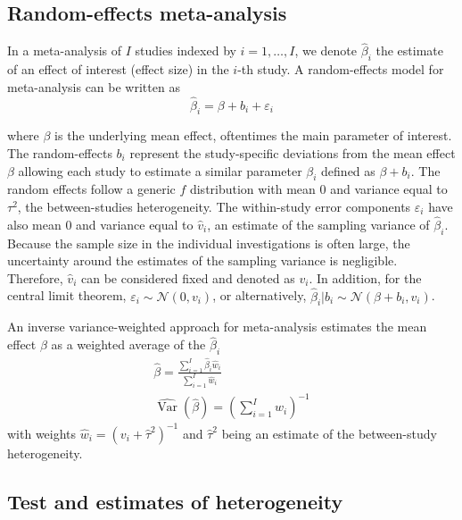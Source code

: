 \documentclass[11pt,a4paper,twoside,openany]{book}\usepackage{knitr}
\DeclareMathOperator{\Var}{Var}
\begin{document}
{\begin{knitrout}
\end{knitrout}


\subsection{Random-effects meta-analysis}
\label{sec:rma}

In a meta-analysis of $I$ studies indexed by $i = 1, \dots, I$, we denote $\hat \beta_i$ the estimate of an effect of interest (effect size) in the $i$-th study.
A random-effects model for meta-analysis can be written as
\begin{equation}
\hat \beta_i = \beta + b_i + \varepsilon_i
\label{eq:rma}
\end{equation}

\noindent where $\beta$ is the underlying mean effect, oftentimes the main parameter of interest. The random-effects $b_i$ represent the study-specific deviations from the mean effect $\beta$ allowing each study to estimate a similar parameter $\beta_i$ defined as $\beta + b_i $. The random effects follow a generic $f$ distribution with mean 0 and variance equal to $\tau^2$, the between-studies heterogeneity. 
The within-study error components $\varepsilon_i$ have also mean 0 and variance equal to $\hat v_i$, an estimate of the sampling variance of $\hat \beta_i$.
Because the sample size in the individual investigations is often large, the uncertainty around the estimates of the sampling variance is negligible. Therefore, $\hat v_i$ can be considered fixed and denoted as $v_i$. In addition, for the central limit theorem, $\varepsilon_i \sim  \mathcal{N}\left(0, v_i \right)$, or alternatively, $\hat \beta_i | b_i \sim \mathcal{N}\left(\beta+b_i, v_i \right)$.

An inverse variance-weighted approach for meta-analysis estimates the mean effect $\beta$ as a weighted average of the $\hat \beta_i$ \citep{whitehead1991general, dersimonian1986meta}
\begin{align}
\hat \beta = \frac{\sum_{i = 1}^I \hat \beta_i \hat w_i}{\sum_{i = 1}^I \hat w_i} \label{eq:avgbeta} \\
\widehat{\Var} \left(\hat \beta \right) = \left( \sum_{i = 1}^I \hat w_i \right)^{-1}
\label{eq:avgvarbeta}
\end{align}
\noindent with weights $\hat w_i = \left(v_i + \hat \tau^2 \right)^{-1}$ and $\hat \tau^2$ being an estimate of the between-study heterogeneity. 


\subsection{Test and estimates of heterogeneity}\label{sec:het_rma}

}
\end{document}
